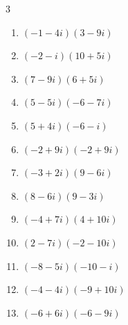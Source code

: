 \begin{multicols}{3}
\begin{enumerate}
        \phantom{$\displaystyle =102-53i$}

  \item $\displaystyle (-1-4i)(3-9i)$

        \phantom{$\displaystyle =-39-3i$}

  \item $\displaystyle (-2-i)(10+5i)$

        \phantom{$\displaystyle =-15-20i$}

  \item $\displaystyle (7-9i)(6+5i)$

        \phantom{$\displaystyle =87-19i$}

  \item $\displaystyle (5-5i)(-6-7i)$

        \phantom{$\displaystyle =-65-5i$}

  \item $\displaystyle (5+4i)(-6-i)$

        \phantom{$\displaystyle =-26-29i$}

  \item $\displaystyle (-2+9i)(-2+9i)$

        \phantom{$\displaystyle =-77-36i$}

  \item $\displaystyle (-3+2i)(9-6i)$

        \phantom{$\displaystyle =-15+36i$}

  \item $\displaystyle (8-6i)(9-3i)$

        \phantom{$\displaystyle =54-78i$}

  \item $\displaystyle (-4+7i)(4+10i)$

        \phantom{$\displaystyle =-86-12i$}

  \item $\displaystyle (2-7i)(-2-10i)$

        \phantom{$\displaystyle =-74-6i$}

  \item $\displaystyle (-8-5i)(-10-i)$

        \phantom{$\displaystyle =75+58i$}

  \item $\displaystyle (-4-4i)(-9+10i)$

        \phantom{$\displaystyle =76-4i$}

\columnbreak %

  \item $\displaystyle (-6+6i)(-6-9i)$


\end{enumerate}
\end{multicols}
